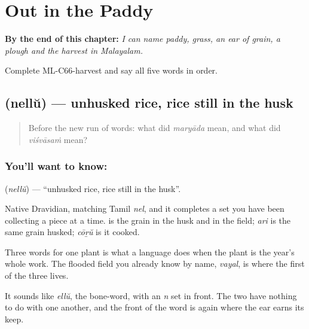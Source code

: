 
\chapter{Out in the Paddy}
\label{ch:ml-out-in-the-paddy}

\begin{chapteropening}
\textbf{By the end of this chapter:} \emph{I can name paddy, grass, an ear of grain, a plough and the harvest in Malayalam.}

Complete ML-C66-harvest and say all five words in order.
\end{chapteropening}

\section[\texorpdfstring{\ml{നെല്ല്} (nellŭ)}{നെല്ല് (nellŭ)}]{ (nellŭ) — unhusked rice, rice still in the husk}

\label{lesson:ML-C66-paddy}



\begin{quote}
Before the new run of words: what did \emph{maryāda} mean, and what did \emph{viśvāsaṁ} mean?
\end{quote}

\subsection*{You'll want to know: }
\textbf{} (\emph{nellŭ}) — \textquotedblleft{}unhusked rice, rice still in the husk\textquotedblright{}.

Native Dravidian, matching Tamil \emph{nel}, and it completes a set you have been collecting a piece at a time.  is the grain in the husk and in the field; \emph{ari} is the same grain husked; \emph{cōṟŭ} is it cooked.

Three words for one plant is what a language does when the plant is the year's whole work. The flooded field you already know by name, \emph{vayal}, is where the first of the three lives.

It sounds like \emph{ellŭ}, the bone-word, with an \emph{n} set in front. The two have nothing to do with one another, and the front of the word is again where the ear earns its keep.

